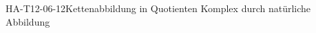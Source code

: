 
\begin{PROP}{HA-T12-06-12}{Kettenabbildung in Quotienten Komplex durch natürliche Abbildung}
\end{PROP}
